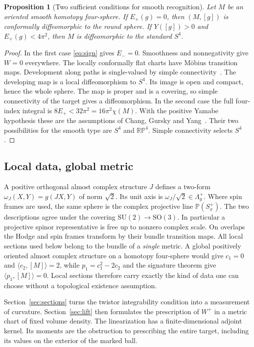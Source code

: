 \documentclass[11pt]{article}
\numberwithin{equation}{section}
\newtheorem{proposition}[theorem]{Proposition}
\theoremstyle{definition}
\theoremstyle{remark}
\begin{document}
\begin{proposition}[Two sufficient conditions for smooth recognition]\label{prop:recognition}
Let \(M\) be an oriented smooth homotopy four-sphere.
If \(E_+(g)=0\), then \((M,[g])\) is conformally diffeomorphic to the
round sphere. If \(Y([g])>0\) and \(E_+(g)<4\pi^2\), then \(M\)
is diffeomorphic to the standard \(S^4\).
\end{proposition}
\begin{proof}
In the first case \eqref{eq:sign} gives \(E_-=0\). Smoothness and
nonnegativity give \(W=0\) everywhere. The locally conformally flat
charts have M\"obius transition maps. Development along paths is
single-valued by simple connectivity~\cite{SchoenYau1988Conformal}.
The developing map is a local diffeomorphism to \(S^4\). Its image is
open and compact, hence the whole sphere. The map is proper and is a
covering, so simple connectivity of the target gives a diffeomorphism.
In the second case the full four-index integral is \(8E_+<32\pi^2
=16\pi^2\chi(M)\). With the positive Yamabe hypothesis these are the
assumptions of Chang, Gursky and Yang~\cite[Theorem A and Remark 2]{ChangGurskyYang2003}.
Their two possibilities for the smooth type are \(S^4\) and
\(\mathbb{RP}^4\). Simple connectivity selects \(S^4\).
\end{proof}

\subsection{Local data, global metric}

A positive orthogonal almost complex structure \(J\) defines a two-form
\(\omega_J(X,Y)=g(JX,Y)\) of norm \(\sqrt2\). Its unit axis is
\(\omega_J/\sqrt2\in\Lambda_g^+\). Where spin frames are used, the
same sphere is the complex projective line \(\mathbb P(S^+_x)\).
The two descriptions agree under the covering
\(\mathrm{SU}(2)\to\mathrm{SO}(3)\).
In particular a projective spinor representative is free up to
nonzero complex scale. On overlaps the Hodge and spin frames transform
by their bundle transition maps. All local sections used below belong to
the bundle of a \emph{single} metric. A global positively oriented almost complex structure
on a homotopy four-sphere would give
\(c_1=0\) and \(\langle c_2,[M]\rangle=2\), while
\(p_1=c_1^2-2c_2\) and the signature theorem give
\(\langle p_1,[M]\rangle=0\). Local sections therefore carry exactly
the kind of data one can choose without a topological existence
assumption.

Section~\ref{sec:sections} turns the twistor integrability condition
into a measurement of curvature. Section~\ref{sec:lift} then formulates
the prescription of \(W^+\) in a metric chart of fixed volume density.
The linearization has a finite-dimensional adjoint kernel. Its moments
are the obstruction to prescribing the entire target, including its
values on the exterior of the marked ball.
\end{document}
